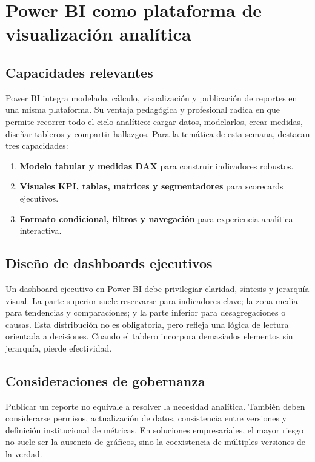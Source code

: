 \documentclass[12pt]{article}
\begin{document}
\section{Power BI como plataforma de visualización analítica}
\subsection{Capacidades relevantes}
Power BI integra modelado, cálculo, visualización y publicación de reportes en una misma plataforma. Su ventaja pedagógica y profesional radica en que permite recorrer todo el ciclo analítico: cargar datos, modelarlos, crear medidas, diseñar tableros y compartir hallazgos. Para la temática de esta semana, destacan tres capacidades:
\begin{enumerate}[label=\textbf{P\arabic*.}, leftmargin=*]
\item \textbf{Modelo tabular y medidas DAX} para construir indicadores robustos.
\item \textbf{Visuales KPI, tablas, matrices y segmentadores} para scorecards ejecutivos.
\item \textbf{Formato condicional, filtros y navegación} para experiencia analítica interactiva.
\end{enumerate}

\subsection{Diseño de dashboards ejecutivos}
Un dashboard ejecutivo en Power BI debe privilegiar claridad, síntesis y jerarquía visual. La parte superior suele reservarse para indicadores clave; la zona media para tendencias y comparaciones; y la parte inferior para desagregaciones o causas. Esta distribución no es obligatoria, pero refleja una lógica de lectura orientada a decisiones. Cuando el tablero incorpora demasiados elementos sin jerarquía, pierde efectividad.

\subsection{Consideraciones de gobernanza}
Publicar un reporte no equivale a resolver la necesidad analítica. También deben considerarse permisos, actualización de datos, consistencia entre versiones y definición institucional de métricas. En soluciones empresariales, el mayor riesgo no suele ser la ausencia de gráficos, sino la coexistencia de múltiples versiones de la verdad.
\end{document}
